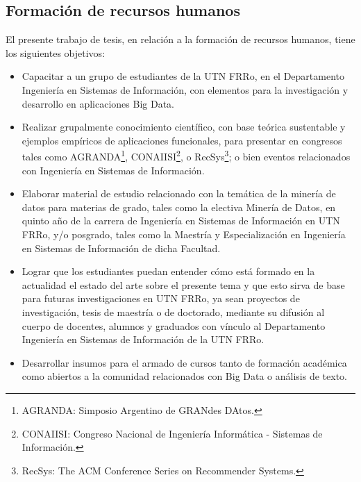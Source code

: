 \subsection{Formación de recursos humanos}
El presente trabajo de tesis, en relación a la formación de recursos humanos, tiene los siguientes objetivos:
\begin{itemize}
	\item Capacitar a un grupo de estudiantes de la UTN FRRo, en el Departamento Ingeniería en Sistemas de Información, con elementos para la investigación y desarrollo en aplicaciones Big Data.
	\item Realizar grupalmente conocimiento científico, con base teórica sustentable y ejemplos empíricos de aplicaciones funcionales, para presentar en congresos tales como AGRANDA\footnote{AGRANDA: Simposio Argentino de GRANdes DAtos.}, CONAIISI\footnote{CONAIISI: Congreso Nacional de Ingeniería Informática - Sistemas de Información.}, o RecSys\footnote{RecSys: The ACM Conference Series on Recommender Systems.}; o bien eventos relacionados con Ingeniería en Sistemas de Información.
	\item Elaborar material de estudio relacionado con la temática de la minería de datos para materias de grado, tales como la electiva Minería de Datos, en quinto año de la carrera de Ingeniería en Sistemas de Información en UTN FRRo, y/o posgrado, tales como la Maestría y Especialización en Ingeniería en Sistemas de Información de dicha Facultad.
	\item Lograr que los estudiantes puedan entender cómo está formado en la actualidad el estado del arte sobre el presente tema y que esto sirva de base para futuras investigaciones en UTN FRRo, ya sean proyectos de investigación, tesis de maestría o de doctorado, mediante su difusión al cuerpo de docentes, alumnos y graduados con vínculo al Departamento Ingeniería en Sistemas de Información de la UTN FRRo.
	\item Desarrollar insumos para el armado de cursos tanto de formación académica como abiertos a la comunidad relacionados con Big Data o análisis de texto.
\end{itemize}


